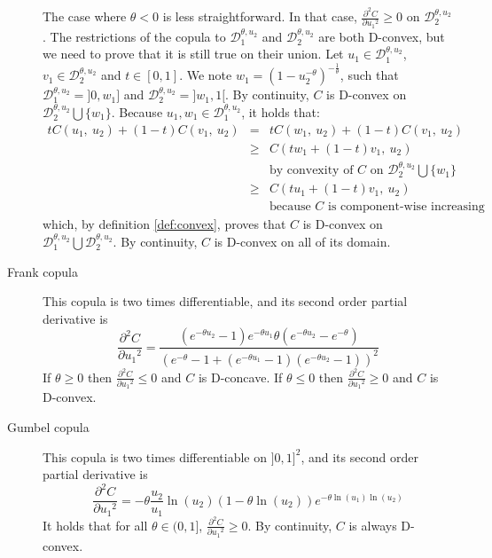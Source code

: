 \begin{remark}
\begin{description}
    The case where $\theta<0$ is less straightforward. In that case, $\frac{\partial^2 C}{\partial {u_1}^2}\geqslant0$ on $\mathcal{D}_2^{\theta,u_2}$. The restrictions of the copula to $\mathcal{D}_1^{\theta,u_2}$ and $\mathcal{D}_2^{\theta,u_2}$ are both D-convex, but we need to prove that it is still true on their union. Let $u_1\in\mathcal{D}_1^{\theta,u_2}$, $v_1\in\mathcal{D}_2^{\theta,u_2}$ and $t\in[0,1]$. We note $w_1=(1-u_2^{-\theta})^{-\frac{1}{\theta}}$, such that $\mathcal{D}_1^{\theta,u_2}=]0,w_1]$ and $\mathcal{D}_2^{\theta,u_2}=]w_1, 1[$. By continuity, $C$ is D-convex on $\mathcal{D}_2^{\theta,u_2}\bigcup\{w_1\}$. Because $u_1,w_1\in \mathcal{D}_1^{\theta,u_2}$, it holds that:
        \begin{eqnarray*}
            tC(u_1,~u_2)+(1-t)C(v_1,~u_2) &=& tC(w_1,~u_2)+(1-t)C(v_1,~u_2)\\
            &\geqslant& C(tw_1+(1-t)v_1,~u_2)\\
            &&\text{by convexity of $C$ on $\mathcal{D}_2^{\theta,u_2}\bigcup\{w_1\}$}\\
            &\geqslant& C(tu_1+(1-t)v_1,~u_2)\\
            && \text{because $C$ is component-wise increasing}
        \end{eqnarray*}
    which, by definition \ref{def:convex}, proves that $C$ is D-convex on $\mathcal{D}_1^{\theta,u_2}\bigcup \mathcal{D}_2^{\theta,u_2}$. By continuity, $C$ is D-convex on all of its domain.
    \item[Frank copula] This copula is two times differentiable, and its second order partial derivative is
    $$\frac{\partial^2 C}{\partial {u_1}^2}=\frac{(e^{-\theta u_2}-1)e^{-\theta u_1}\theta(e^{-\theta u_2}-e^{-\theta} )}{(e^{-\theta}-1+(e^{-\theta u_1}-1)(e^{-\theta u_2}-1))^2}$$
    If $\theta\geqslant0$ then $\frac{\partial^2 C}{\partial {u_1}^2}\leqslant 0$ and $C$ is D-concave. If $\theta\leqslant0$ then $\frac{\partial^2 C}{\partial {u_1}^2}\geqslant 0$ and $C$ is D-convex.
    \item[Gumbel copula] This copula is two times differentiable on $]0,1]^2$, and its second order partial derivative is
    $$\frac{\partial^2 C}{\partial {u_1}^2}=-\theta\frac{u_2}{u_1}\ln(u_2)(1-\theta\ln(u_2))e^{-\theta\ln(u_1)\ln(u_2)}$$
    It holds that for all $\theta\in(0,1]$, $\frac{\partial^2 C}{\partial {u_1}^2}\geqslant0$. By continuity, $C$ is always D-convex.
    \end{description}
    

\end{remark}
